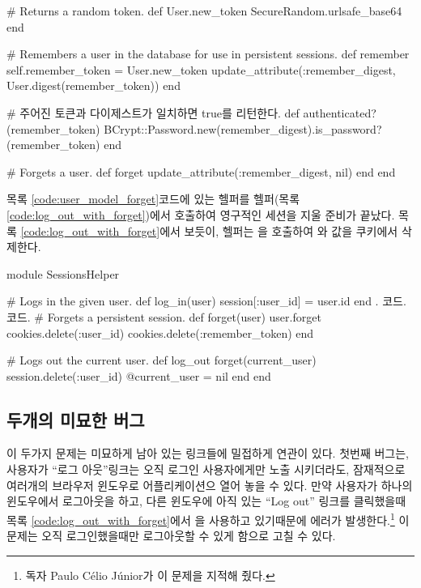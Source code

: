 {{\begin{codelisting}
\begin{code}
# Returns a random token. def User.new_token SecureRandom.urlsafe_base64 end 

# Remembers a user in the database for use in persistent sessions. def remember self.remember_token = User.new_token update_attribute(:remember_digest, User.digest(remember_token)) end 

# 주어진 토큰과 다이제스트가 일치하면 true를 리턴한다. def authenticated?(remember_token) BCrypt::Password.new(remember_digest).is_password?(remember_token) end 

# Forgets a user. def forget update_attribute(:remember_digest, nil) end end \end{code} \end{codelisting} 

목록 \ref{code:user_model_forget}코드에 있는  헬퍼를  헬퍼(목록 \ref{code:log_out_with_forget})에서 호출하여 영구적인 세션을 지울 준비가 끝났다. 목록 \ref{code:log_out_with_forget}에서 보듯이,  헬퍼는  을 호출하여 와 값을 쿠키에서 삭제한다. 

\begin{codelisting} \label{code:log_out_with_forget}  

\begin{code} module SessionsHelper 

# Logs in the given user. def log_in(user) session[:user_id] = user.id end . 코드. 코드. # Forgets a persistent session. def forget(user) user.forget cookies.delete(:user_id) cookies.delete(:remember_token) end 

# Logs out the current user. def log_out forget(current_user) session.delete(:user_id) @current_user = nil end end \end{code} \end{codelisting} 

\subsection{두개의 미묘한 버그} \label{sec:two_subtle_bugs} 

이 두가지 문제는 미묘하게 남아 있는 링크들에 밀접하게 연관이 있다. 첫번째 버그는, 사용자가 ``로그 아웃''링크는 오직 로그인 사용자에게만 노출 시키더라도, 잠재적으로 여러개의 브라우저 윈도우로 어플리케이션으 열어 놓을 수 있다. 만약 사용자가 하나의 윈도우에서 로그아웃을 하고, 다른 윈도우에 아직 있는 ``Log out'' 링크를 클릭했을때 목록 \ref{code:log_out_with_forget}에서 을 사용하고 있기때문에 에러가 발생한다.\footnote{독자 Paulo Célio Júnior가 이 문제을 지적해 줬다.} 이 문제는 오직 로그인했을때만 로그아웃할 수 있게 함으로 고칠 수 있다. 

}}
